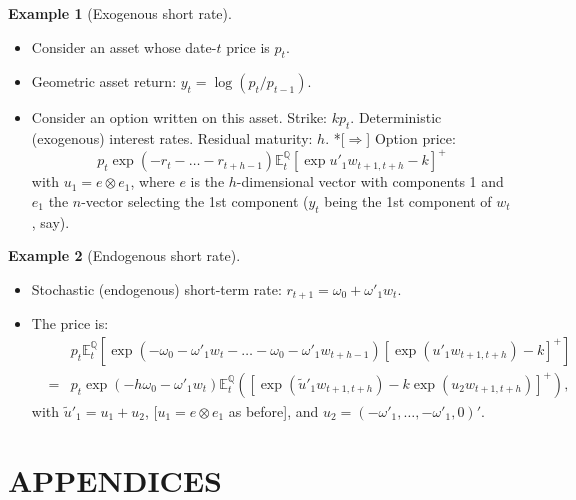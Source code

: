 \documentclass[
  12pt,
]{book}
\providecommand{\tightlist}{%
  \setlength{\itemsep}{0pt}\setlength{\parskip}{0pt}}
\theoremstyle{definition}
\theoremstyle{definition}
\newtheorem{example}{Example}[chapter]
\theoremstyle{definition}
\theoremstyle{definition}
\theoremstyle{remark}
\begin{document}
\begin{example}[Exogenous short rate]
\protect\hypertarget{exm:ExogSTR}{}\label{exm:ExogSTR}\leavevmode

\begin{itemize}
\tightlist
\item
  Consider an asset whose date-\(t\) price is \(p_t\).
\item
  Geometric asset return: \(y_t = \log(p_t/p_{t-1})\).
\item
  Consider an option written on this asset. Strike: \(k p_t\). Deterministic (exogenous) interest rates. Residual maturity: \(h\).
  *{[}\(\Rightarrow\){]} Option price:
  \[
  p_t   \exp(-r_{t}-\dots-r_{t+h-1}) \mathbb{E}^{\mathbb{Q}}_t[\exp   u'_1 w_{t+1, t+h} - k]^+
  \]
  with \(u_1 = e \otimes e_1\), where \(e\) is the \(h\)-dimensional vector with components 1 and \(e_1\) the \(n\)-vector selecting the 1st component (\(y_t\) being the 1st component of \(w_t\), say).
\end{itemize}

\end{example}

\begin{example}[Endogenous short rate]
\protect\hypertarget{exm:EndogSTR}{}\label{exm:EndogSTR}\leavevmode

\begin{itemize}
\tightlist
\item
  Stochastic (endogenous) short-term rate: \(r_{t+1} = \omega_0 + \omega'_1 w_t\).
\item
  The price is:
  \begin{eqnarray*}
  && p_t \mathbb{E}^{\mathbb{Q}}_t  \left[ \exp(-\omega_0 - \omega'_1 w_t-\dots- \omega_0 - \omega'_1 w_{t+h-1}) [\exp(u'_1 w_{t+1,t+h})-k]^+ \right]\\
  &= & p_t   \exp(-h \omega_0 - \omega'_1 w_t)\mathbb{E}^{\mathbb{Q}}_t\left(\left[\exp(\tilde{u}'_1w_{t+1,t+h})-k   \exp(u_2 w_{t+1, t+h})\right]^+\right),
  \end{eqnarray*}
  with \(\tilde{u}'_1 = u_1 + u_2\), {[}\(u_1 = e \otimes e_1\) as before{]}, and \(u_2 = (-\omega'_1,\dots, -\omega'_1, 0)'\).
\end{itemize}

\end{example}

\hypertarget{appendices}{%
\section{APPENDICES}\label{appendices}}
\end{document}
